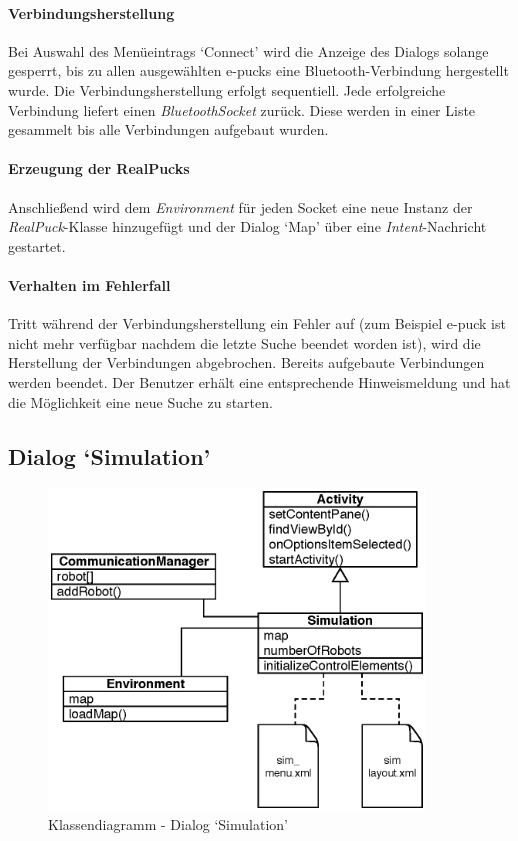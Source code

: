 \documentclass[10pt,a4paper]{article}
\begin{document}
	\paragraph*{Verbindungsherstellung}
	Bei Auswahl des Menüeintrags `Connect' wird die Anzeige des Dialogs solange gesperrt, bis zu allen ausgewählten e-pucks eine Bluetooth-Verbindung
	hergestellt wurde. Die Verbindungsherstellung erfolgt sequentiell. Jede erfolgreiche Verbindung liefert einen \textit{BluetoothSocket} zurück.
	Diese werden in einer Liste gesammelt bis alle Verbindungen aufgebaut wurden.
	
	\paragraph*{Erzeugung der RealPucks}
	Anschließend wird dem \textit{Environment} für jeden Socket eine neue Instanz der \textit{RealPuck}-Klasse hinzugefügt und der Dialog `Map' über
	eine \textit{Intent}-Nachricht gestartet.
	
	\paragraph*{Verhalten im Fehlerfall}
	Tritt während der Verbindungsherstellung ein Fehler auf (zum Beispiel e-puck ist nicht mehr verfügbar nachdem die letzte Suche beendet worden
	ist), wird die Herstellung der Verbindungen abgebrochen. Bereits aufgebaute Verbindungen werden beendet. Der Benutzer erhält eine entsprechende
	Hinweismeldung und hat die Möglichkeit eine neue Suche zu starten.
	
	\subsection*{Dialog `Simulation'}
	\label{subsec:dialog_sim}
	
	\begin{figure}[h]
			\centering
			\includegraphics[width=10cm]{images/entwurf_sim.eps}
  			\caption{Klassendiagramm - Dialog `Simulation'}
  			\label{fig:dialog_sim}
  	\end{figure}
	
\end{document}
